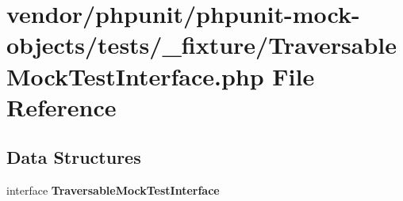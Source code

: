 \section{vendor/phpunit/phpunit-\/mock-\/objects/tests/\+\_\+fixture/\+Traversable\+Mock\+Test\+Interface.php File Reference}
\label{_traversable_mock_test_interface_8php}
\subsection*{Data Structures}
\begin{DoxyCompactItemize}
\item 
interface {\bf Traversable\+Mock\+Test\+Interface}
\end{DoxyCompactItemize}
